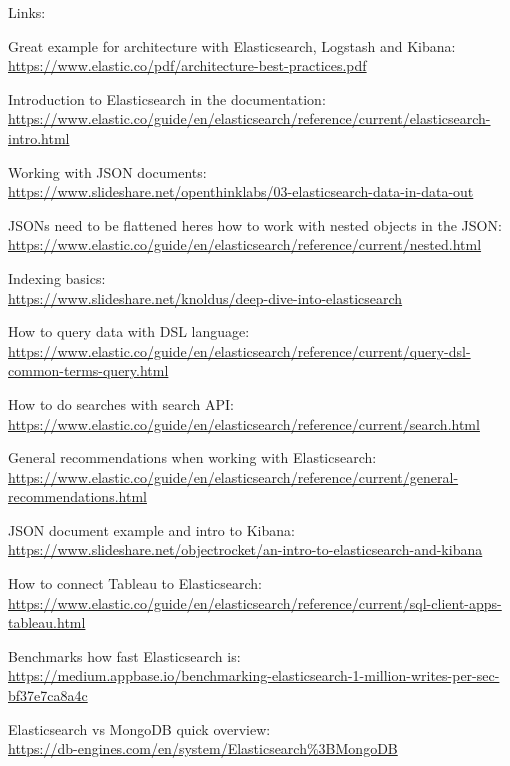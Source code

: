 \documentclass[12pt, numbers=noenddot]{scrreprt} %
\begin{document}
Links:

Great example for architecture with Elasticsearch, Logstash and Kibana: \\
\url{https://www.elastic.co/pdf/architecture-best-practices.pdf}

Introduction to Elasticsearch in the documentation: \\
\url{https://www.elastic.co/guide/en/elasticsearch/reference/current/elasticsearch-intro.html}

Working with JSON documents: \\
\url{https://www.slideshare.net/openthinklabs/03-elasticsearch-data-in-data-out}

JSONs need to be flattened heres how to work with nested objects in the JSON: \\
\url{https://www.elastic.co/guide/en/elasticsearch/reference/current/nested.html}

Indexing basics: \\
\url{https://www.slideshare.net/knoldus/deep-dive-into-elasticsearch}

How to query data with DSL language: \\
\url{https://www.elastic.co/guide/en/elasticsearch/reference/current/query-dsl-common-terms-query.html}

How to do searches with search API: \\
\url{https://www.elastic.co/guide/en/elasticsearch/reference/current/search.html}

General recommendations when working with Elasticsearch: \\
\url{https://www.elastic.co/guide/en/elasticsearch/reference/current/general-recommendations.html}

JSON document example and intro to Kibana: \\
\url{https://www.slideshare.net/objectrocket/an-intro-to-elasticsearch-and-kibana}

How to connect Tableau to Elasticsearch: \\
\url{https://www.elastic.co/guide/en/elasticsearch/reference/current/sql-client-apps-tableau.html}

Benchmarks how fast Elasticsearch is: \\
\url{https://medium.appbase.io/benchmarking-elasticsearch-1-million-writes-per-sec-bf37e7ca8a4c}

Elasticsearch vs MongoDB quick overview: \\
\url{https://db-engines.com/en/system/Elasticsearch%3BMongoDB}
\end{document}
